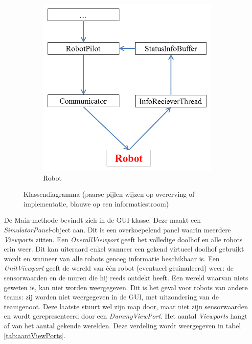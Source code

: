 \documentclass[tt2]{penoverslag}
\begin{document}
\begin{landscape}
\begin{figure}
\begin{subfigure}{0.45\textwidth}
		\includegraphics[width=\textwidth]{KlasRobot}
	\caption{Robot}
\end{subfigure}
\caption[Klassendiagramma]{Klassendiagramma (paarse pijlen wijzen op overerving of implementatie, blauwe op een informatiestroom)}
\label{fig:klasDia}
\end{figure}
\end{landscape}

De Main-methode bevindt zich in de GUI-klasse. Deze maakt een \textit{SimulatorPanel}-object aan. Dit is een overkoepelend panel waarin meerdere \textit{Viewports} zitten. Een \textit{OverallViewport} geeft het volledige doolhof en alle robots erin weer. Dit kan uiteraard enkel wanneer een gekend virtueel doolhof gebruikt wordt en wanneer van alle robots genoeg informatie beschikbaar is. Een \textit{UnitViewport} geeft de wereld van \'e\'en robot (eventueel gesimuleerd) weer: de sensorwaarden en de muren die hij reeds ontdekt heeft. Een wereld waarvan niets geweten is, kan niet worden weergegeven. Dit is het geval voor robots van andere teams: zij worden niet weergegeven in de GUI, met uitzondering van de teamgenoot. Deze laatste stuurt wel zijn map door, maar niet zijn sensorwaarden en wordt gerepresenteerd door een \textit{DummyViewPort}. Het aantal \textit{Viewports} hangt af van het aantal gekende werelden. Deze verdeling wordt weergegeven in tabel \ref{tab:aantViewPorts}.\\
\end{document}
